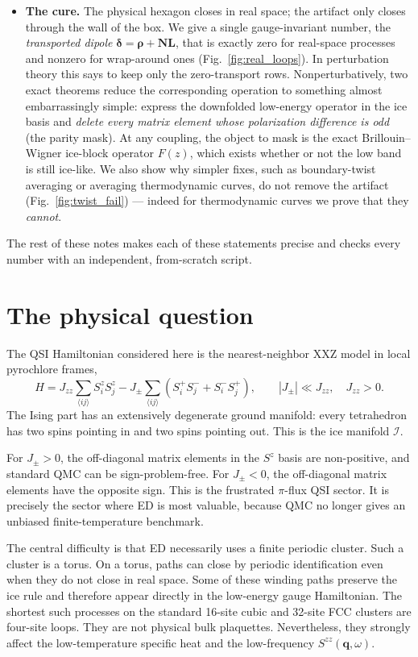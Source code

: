 \documentclass[11pt,letterpaper]{article}
\newcommand{\Jzz}{J_{zz}}
\newcommand{\Jpm}{J_{\pm}}
\newcommand{\bN}{\bm N}
\newcommand{\bL}{\bm L}
\newcommand{\bq}{\bm q}
\newcommand{\brho}{\bm \rho}
\newcommand{\bdelta}{\bm \delta}
\newcommand{\ice}{\mathcal I}
\theoremstyle{plain}
\theoremstyle{definition}
\begin{document}
\begin{itemize}
\item \textbf{The cure.}  The physical hexagon closes in real space; the
artifact only closes through the wall of the box.  We give a single
gauge-invariant number, the \emph{transported dipole}
$\bdelta=\brho+\bN\bL$, that is exactly zero for real-space processes and
nonzero for wrap-around ones (Fig.~\ref{fig:real_loops}).  In perturbation
theory this says to keep only the zero-transport rows.  Nonperturbatively,
two exact theorems reduce the corresponding operation to something almost
embarrassingly simple: express the downfolded low-energy operator in the ice
basis and \emph{delete every matrix element whose polarization difference is
odd} (the parity mask).  At any coupling, the object to mask is the exact
Brillouin--Wigner ice-block operator $F(z)$, which exists whether or not the
low band is still ice-like.  We also show why simpler fixes, such as
boundary-twist averaging or averaging thermodynamic curves, do not remove
the artifact (Fig.~\ref{fig:twist_fail}) --- indeed for thermodynamic curves
we prove that they \emph{cannot}.
\end{itemize}

The rest of these notes makes each of these statements precise and checks
every number with an independent, from-scratch script.

\section{The physical question}

The QSI Hamiltonian considered here is the nearest-neighbor XXZ model in
local pyrochlore frames,
\begin{equation}
H =
\Jzz\sum_{\langle ij\rangle} S_i^zS_j^z
-\Jpm\sum_{\langle ij\rangle}
\left(S_i^+S_j^-+S_i^-S_j^+\right),
\qquad |\Jpm|\ll \Jzz,\quad \Jzz>0 .
\label{eq:model}
\end{equation}
The Ising part has an extensively degenerate ground manifold: every
tetrahedron has two spins pointing in and two spins pointing out.  This is
the ice manifold $\ice$.

For $\Jpm>0$, the off-diagonal matrix elements in the $S^z$ basis are
non-positive, and standard QMC can be sign-problem-free.  For $\Jpm<0$,
the off-diagonal matrix elements have the opposite sign.  This is the
frustrated $\pi$-flux QSI sector.  It is precisely the sector where ED is
most valuable, because QMC no longer gives an unbiased finite-temperature
benchmark.

The central difficulty is that ED necessarily uses a finite periodic
cluster.  Such a cluster is a torus.  On a torus, paths can close by
periodic identification even when they do not close in real space.  Some of
these winding paths preserve the ice rule and therefore appear directly in
the low-energy gauge Hamiltonian.  The shortest such processes on the
standard 16-site cubic and 32-site FCC clusters are four-site loops.  They
are not physical bulk plaquettes.  Nevertheless, they strongly affect the
low-temperature specific heat and the low-frequency $S^{zz}(\bq,\omega)$.
\end{document}
